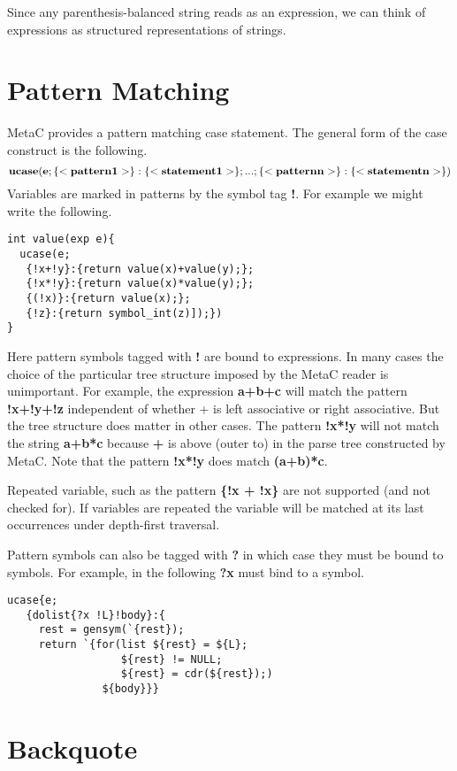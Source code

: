 \documentclass{article}
\begin{document}
Since any parenthesis-balanced string reads as an expression, we can think of expressions as structured representations of strings.

\section{Pattern Matching}

MetaC provides a pattern matching case statement.
The general form of the case construct is the following.
$${\bf ucase(e; \{<pattern1>\}:\{<statement1>\}; ... ;\{<patternn>\}:\{<statementn>\})}$$
Variables are marked in patterns by the symbol tag {\bf !}. For example we might write the following.

\begin{verbatim}
int value(exp e){
  ucase(e;
   {!x+!y}:{return value(x)+value(y);};
   {!x*!y}:{return value(x)*value(y);};
   {(!x)}:{return value(x);};
   {!z}:{return symbol_int(z)]);})
}
\end{verbatim}

Here pattern symbols tagged with {\bf !} are bound to expressions. In many cases the choice of the particular tree structure imposed by the MetaC reader is unimportant.  For example, the expression {\bf a+b+c} will match the pattern
{\bf !x+!y+!z} independent of whether + is left associative or right associative.  But the tree structure does matter in other cases.  The pattern {\bf !x*!y}
will not match the string {\bf a+b*c} because {\bf +} is above (outer to) {\bf *} in the parse tree constructed by MetaC. Note that the pattern {\bf !x*!y} does match {\bf (a+b)*c}.

Repeated variable, such as the pattern {\bf \{!x + !x\}} are not supported (and not checked for).  If variables are repeated the variable will be matched at its last occurrences under depth-first traversal.

Pattern symbols can also be tagged with {\bf ?} in which case they must be bound to symbols.  For example, in the following {\bf ?x} must bind to a symbol.

\begin{verbatim}
ucase{e;
   {dolist{?x !L}!body}:{
     rest = gensym(`{rest});
     return `{for(list ${rest} = ${L};
                  ${rest} != NULL;
                  ${rest} = cdr(${rest});)
               ${body}}}
\end{verbatim}

\section{Backquote}
\end{document}
